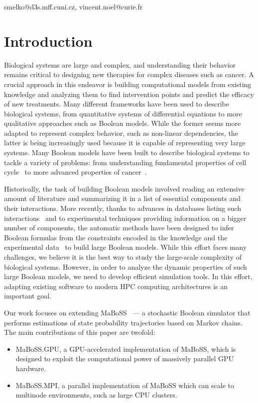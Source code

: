 \documentclass[times, twoside]{zHenriquesLab-StyleBioRxiv}
\begin{document}
\begin{corrauthor}
smelko@d3s.mff.cuni.cz, vincent.noel@curie.fr
\end{corrauthor}
\section*{Introduction}
Biological systems are large and complex, and understanding their behavior remains critical to designing new therapies for complex diseases such as cancer. A crucial approach in this endeavor is building computational models from existing knowledge and analyzing them to find intervention points and predict the efficacy of new treatments.
Many different frameworks have been used to describe biological systems, from quantitative systems of differential equations to more qualitative approaches such as Boolean models. While the former seems more adapted to represent complex behavior, such as non-linear dependencies, the latter is being increasingly used because it is capable of representing very large systems.
Many Boolean models have been built to describe biological systems to tackle a variety of problems: from understanding fundamental properties of cell cycle~\cite{faure2006cellcycle,sizek2019boolean} to more advanced properties of cancer~\cite{fumia_carcinogenesis_2013, montagud2022prostate}.

Historically, the task of building Boolean models involved reading an extensive amount of literature and summarizing it in a list of essential components and their interactions. More recently, thanks to advances in databases listing such interactions~\cite{licata2020signor,turei2016omnipath} and to experimental techniques providing information on a bigger number of components, the automatic methods have been designed to infer Boolean formulas from the constraints encoded in the knowledge and the experimental data~\cite{10.1093/bioinformatics/btaa484,chevalier2020synthesis,benevs2023boolean} to build large Boolean models. While this effort faces many challenges, we believe it is the best way to study the large-scale complexity of biological systems. However, in order to analyze the dynamic properties of such large Boolean models, we need to develop efficient simulation tools. In this effort, adapting existing software to modern HPC computing architectures is an important goal. 

Our work focuses on extending MaBoSS~\cite{stoll2012continuous, stoll2017maboss} --- a stochastic Boolean simulator that performs estimations of state probability trajectories based on Markov chains. 
The main contributions of this paper are twofold:
\begin{itemize}
    \item MaBoSS.GPU, a GPU-accelerated implementation of MaBoSS, which is designed to exploit the computational power of massively parallel GPU hardware.
    \item MaBoSS.MPI, a parallel implementation of MaBoSS which can scale to multinode environments, such as large CPU clusters.
\end{itemize}
\end{document}
